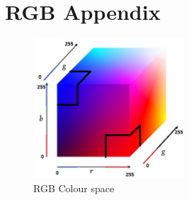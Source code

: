 \section{RGB Appendix}
\label{apx:rgb}

\begin{figure}[h]
  \caption{RGB Colour space}
  \label{vis4}
  \centering
    \includegraphics[width=0.5\textwidth]{RGB_Space.jpg}
\end{figure}
